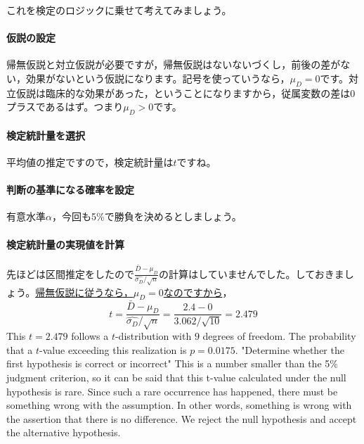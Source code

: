 \documentclass{ltjsbook}
\begin{document}
これを検定のロジックに乗せて考えてみましょう。
\paragraph{仮説の設定}帰無仮説と対立仮説が必要ですが，帰無仮説はないないづくし，前後の差がない，効果がないという仮説になります。記号を使っていうなら，$\mu_D=0$です。対立仮説は臨床的な効果があった，ということになりますから，従属変数の差は0プラスであるはず。つまり$\mu_D > 0$です。
\paragraph{検定統計量を選択}平均値の推定ですので，検定統計量は$t$ですね。
\paragraph{判断の基準になる確率を設定}有意水準$\alpha$，今回も5\%で勝負を決めるとしましょう。
\paragraph{検定統計量の実現値を計算}先ほどは区間推定をしたので$\frac{\bar{D}-\mu_D}{\hat{\sigma_D}/\sqrt{n}} $の計算はしていませんでした。しておきましょう。\underline{帰無仮説に従うなら，$\mu_D=0$なのですから}，
\[t= \frac{\bar{D}-\mu_D}{\hat{\sigma_D}/\sqrt{n}}  = \frac{2.4-0}{3.062/\sqrt{10}}  = 2.479\]
This $t = 2.479$ follows a $t$-distribution with $9$ degrees of freedom. The probability that a $t$-value exceeding this realization is $p=0.0175$.
"Determine whether the first hypothesis is correct or incorrect"
This is a number smaller than the 5\% judgment criterion, so it can be said that this t-value calculated under the null hypothesis is rare. Since such a rare occurrence has happened, there must be something wrong with the assumption. In other words, something is wrong with the assertion that there is no difference. We reject the null hypothesis and accept the alternative hypothesis.
\end{document}
